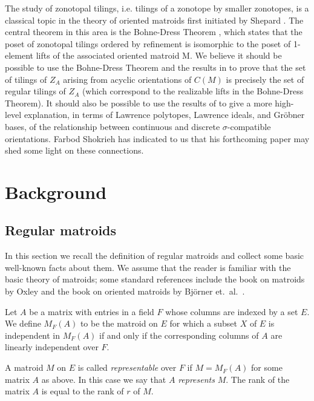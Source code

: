 \documentclass[12pt]{amsart}
\numberwithin{equation}{section}
\theoremstyle{definition}
\begin{document}
The study of zonotopal tilings, i.e. tilings of a zonotope by smaller zonotopes, is a classical topic in the theory of oriented matroids first initiated by Shepard \cite{shephard1974zonotopes}.   The central theorem in this area is the Bohne-Dress Theorem \cite{bohne1992zonotopaler,dress1989oriented}, which states that the poset of zonotopal tilings ordered by refinement is isomorphic to the poset of 1-element lifts of the associated oriented matroid M.  We believe it should be possible to use the Bohne-Dress Theorem and the results in \cite{bayer1997discriminantal} to prove that the set of tilings of $Z_A$ arising from acyclic orientations of $C(M)$ is precisely the set of regular tilings of $Z_A$ (which correspond to the realizable lifts in the Bohne-Dress Theorem).  It should also be possible to use the results of \cite{birkett2000cayley} to give a more high-level explanation, in terms of Lawrence polytopes, Lawrence ideals, and Gr{\"o}bner bases, of the relationship between continuous and discrete $\sigma$-compatible orientations.  Farbod Shokrieh has indicated to us that his forthcoming paper \cite{farbod2016draft} may shed some light on these connections.

\section{Background}

\subsection{Regular matroids} \label{sec:regularmatroids}


In this section we recall the definition of regular matroids and collect some basic well-known facts about them.
We assume that the reader is familiar with the basic theory of matroids; some standard references include the book on matroids by Oxley \cite{oxley2006matroid} and the book on oriented matroids by Bj{\"o}rner et.~al.~\cite{bjorner1999oriented}.

\medskip

Let $A$ be a matrix with entries in a field $F$ whose columns are indexed by a set $E$.
We define $M_F(A)$ to be the matroid on $E$ for which 
a subset $X$ of $E$ is independent in $M_F(A)$ if and only if the corresponding columns of $A$ are linearly independent over $F$.

A matroid $M$ on $E$ is called {\em representable} over $F$ if $M=M_F(A)$ for some matrix $A$ as above.
In this case we say that $A$ {\em represents} $M$.
The rank of the matrix $A$ is equal to the rank of $r$ of $M$.
\end{document}
